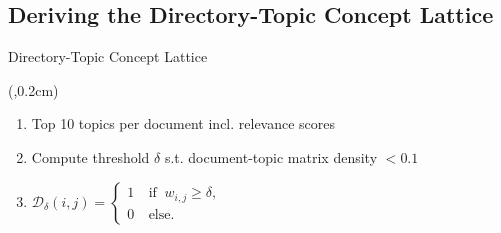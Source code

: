 \subsection{Deriving the Directory-Topic Concept Lattice}
\begin{frame}{Directory-Topic Concept Lattice}
    \begin{textblock*}{4cm}(\paperwidth-4.1cm,0.2cm) %
        \only<1>{
            
        }
    \end{textblock*}
    \begin{enumerate}
        \item <1,3-4> Top 10 topics per document incl. relevance scores
        \item <3-4> Compute threshold $\delta$ s.t. document-topic matrix density $< 0.1$
        \item <4> $\mathcal{D}_\delta(i,j)=\left\{ \begin{array}{cl}
                        1 & \ \text{if } \ w_{i,j} \geq \delta, \\
                        0 & \ \text{else.}
                    \end{array} \right.$
    \end{enumerate}



\end{frame}
